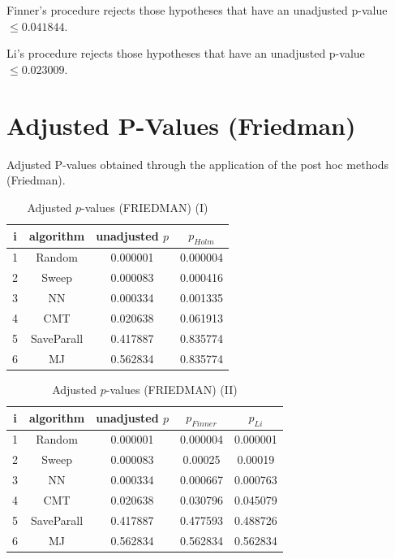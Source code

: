 \documentclass[a4paper,10pt]{article}
\begin{document}
\begin{landscape}
Finner's procedure rejects those hypotheses that have an unadjusted p-value $\le0.041844$.

Li's procedure rejects those hypotheses that have an unadjusted p-value $\le0.023009$.


\newpage

\section{Adjusted P-Values (Friedman)}


Adjusted P-values obtained through the application of the post hoc methods (Friedman).

\begin{table}[!htp]
\centering\small
\begin{tabular}{cccc}
i&algorithm&unadjusted $p$&$p_{Holm}$\\
\hline1&Random&0.000001&0.000004\\2&Sweep&0.000083&0.000416\\3&NN&0.000334&0.001335\\4&CMT&0.020638&0.061913\\5&SaveParall&0.417887&0.835774\\6&MJ&0.562834&0.835774\\\hline
\end{tabular}
\caption{Adjusted $p$-values (FRIEDMAN) (I)}
\end{table}
\begin{table}[!htp]
\centering\small
\begin{tabular}{ccccc}
i&algorithm&unadjusted $p$&$p_{Finner}$&$p_{Li}$\\
\hline1&Random&0.000001&0.000004&0.000001\\2&Sweep&0.000083&0.00025&0.00019\\3&NN&0.000334&0.000667&0.000763\\4&CMT&0.020638&0.030796&0.045079\\5&SaveParall&0.417887&0.477593&0.488726\\6&MJ&0.562834&0.562834&0.562834\\\hline
\end{tabular}
\caption{Adjusted $p$-values (FRIEDMAN) (II)}
\end{table}

\newpage
\end{landscape}
\end{document}
